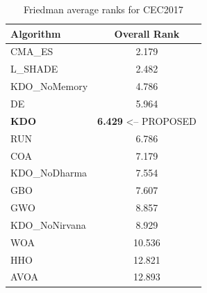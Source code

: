 \begin{table}[H]
\centering\small
\caption{Friedman average ranks for CEC2017}
\label{tab:cec2017_friedman}
\begin{tabular}{lc}
\toprule
\textbf{Algorithm} & \textbf{Overall Rank} \\
\midrule
CMA_ES & 2.179 \\
L_SHADE & 2.482 \\
KDO_NoMemory & 4.786 \\
DE & 5.964 \\
\textbf{KDO} & \textbf{6.429}  <-- PROPOSED \\
RUN & 6.786 \\
COA & 7.179 \\
KDO_NoDharma & 7.554 \\
GBO & 7.607 \\
GWO & 8.857 \\
KDO_NoNirvana & 8.929 \\
WOA & 10.536 \\
HHO & 12.821 \\
AVOA & 12.893 \\
\bottomrule
\end{tabular}
\end{table}
